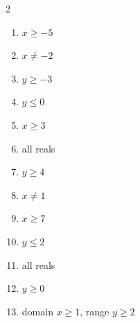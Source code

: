 \documentclass[11pt]{article}
\begin{document}
\begin{keybox}
\begin{multicols}{2}
\small
\begin{enumerate}[leftmargin=*,itemsep=3pt]
  \item $x\ge-5$
  \item $x\ne-2$
  \item $y\ge-3$
  \item $y\le0$
  \item $x\ge3$
  \item all reals
  \item $y\ge4$
  \item $x\ne1$
  \item $x\ge7$
  \item $y\le2$
  \item all reals
  \item $y\ge0$
  \item domain $x\ge1$, range $y\ge2$
\end{enumerate}
\end{multicols}
\end{keybox}
\end{document}
